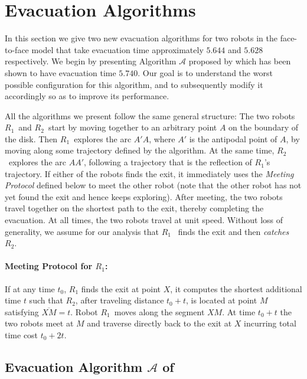 \documentclass[
final
]{dmtcs-episciences}
\newcommand{\barr}[1]{\overline{#1}}
\newcommand{\RA}{\ensuremath{R_1}}
\newcommand{\RB}{\ensuremath{R_2 }}
\newcommand{\ff}{face-to-face }
\theoremstyle{definition}
\begin{document}
\section{Evacuation Algorithms}
\label{sec:Evacuation Algorithms}


In this section we give two new evacuation algorithms for two robots in the  \ff model that take evacuation time approximately
$5.644$ and $5.628$ respectively. 
We begin by presenting  Algorithm $\mathcal A$ proposed by \cite{CGGKMP}
which has been shown to have evacuation time 
$5.740$.
Our goal is to understand the worst possible configuration for this algorithm, and to subsequently modify it accordingly so as to improve its performance. 

 All the algorithms we present follow the same general structure: 
 The two robots \RA\ and \RB\ start by moving together to an arbitrary point $A$ on the boundary of the disk. 
 Then \RA\ explores the arc $A'A$, where $A'$ is the antipodal point of $A$, by moving along some trajectory defined by the algorithm.
 At the same time, \RB\ explores the arc $AA'$, following a trajectory that is the reflection of \RA's trajectory.
 If either of the robots finds the exit, it immediately uses the {\em Meeting Protocol} defined below to meet the other robot (note that the other robot has not yet found the exit and hence keeps exploring). 
 After meeting, the two robots travel together on the shortest path to the exit, thereby completing the evacuation. 
 At all times, the two robots travel at unit speed. 
 Without loss of generality, we assume for our analysis that \RA~ finds the exit and then {\em catches}~\RB. 



 \paragraph{Meeting Protocol for $R_1$:}
If at any time $t_0$,  $\RA$  finds the exit at point $X$, it 
computes the shortest additional time $t$ such that $\RB$, after traveling 
distance $t_0+t$, is located at point $M$ satisfying $\barr{XM}=t$. 
Robot \RA\ moves along the segment $XM$. At time $t_0+t$ the two robots meet 
at $M$ and traverse  directly back to the exit at $X$ incurring total time cost 
$t_0+2t$.

\subsection{Evacuation Algorithm  \texorpdfstring{$\mathcal A$}{Lg} of \texorpdfstring{\cite{CGGKMP}}{Lg}}
\end{document}
